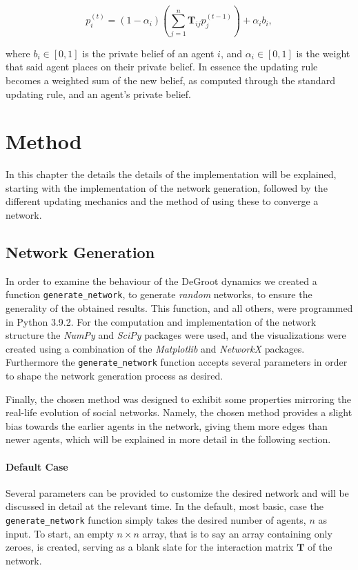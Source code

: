 \documentclass[a4paper, 12pt]{report}
\newcommand{\T}{\bm{T}}
\newcommand{\Tij}{\T_{ij}}
\newcommand{\beli}[3][2]{p_{#2}^{(#3)}}
\begin{document}
\begin{equation*}
    \beli{i}{t} = (1-\alpha_i)(\sum_{j=1}^{n}\Tij\beli{j}{t-1}) + \alpha_i b_i,
\end{equation*}

\noindent where $b_i \in [0, 1]$ is the private belief of an agent $i$, and $\alpha_i \in [0, 1]$ is the weight that said agent places on their private belief. In essence the updating rule becomes a weighted sum of the new belief, as computed through the standard updating rule, and an agent's private belief.
 
\newpage


\chapter{Method}
\label{chapter:implementation}
In this chapter the details the details of the implementation will be explained, starting with the implementation of the network generation, followed by the different updating mechanics and the method of using these to converge a network.
\section{Network Generation}
\label{generation:random}

In order to examine the behaviour of the DeGroot dynamics we created a function \texttt{generate\_network}, to generate \emph{random} networks, to ensure the generality of the obtained results. This function, and all others, were programmed in Python 3.9.2. For the computation and implementation of the network structure the \emph{NumPy} \parencite{2020NumPy-Array} and \emph{SciPy} \parencite{2020SciPy-NMeth} packages were used, and the visualizations were created using a combination of the \emph{Matplotlib} \parencite{matplotlib} and \emph{NetworkX} \parencite{networkx} packages. Furthermore the \texttt{generate\_network} function accepts several parameters in order to shape the network generation process as desired.

\noindent Finally, the chosen method was designed to exhibit some properties mirroring the real-life evolution of social networks. Namely, the chosen method provides a slight bias towards the earlier agents in the network, giving them more edges than newer agents, which will be explained in more detail in the following section.

\subsubsection{Default Case}
Several parameters can be provided to customize the desired network and will be discussed in detail at the relevant time. In the default, most basic, case the \texttt{generate\_network} function simply takes the desired number of agents, $n$ as input. To start, an empty $n\times n$ array,  that is to say an array containing only zeroes, is created, serving as a blank slate for the interaction matrix $\T$ of the network. 
\end{document}
